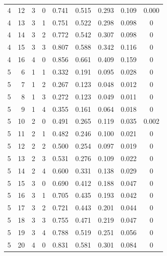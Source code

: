 \begin{table}[p]
\begin{tabular}{rrrr ccccc}
4 & 12 & 3 & 0 & 0.741 & 0.515 & 0.293 & 0.109 & 0.000 \\
4 & 13 & 3 & 1 & 0.751 & 0.522 & 0.298 & 0.098 & 0 \\
4 & 14 & 3 & 2 & 0.772 & 0.542 & 0.307 & 0.098 & 0 \\
4 & 15 & 3 & 3 & 0.807 & 0.588 & 0.342 & 0.116 & 0 \\
4 & 16 & 4 & 0 & 0.856 & 0.661 & 0.409 & 0.159 & 0 \\
\midrule
5 & 6 & 1 & 1 & 0.332 & 0.191 & 0.095 & 0.028 & 0 \\
5 & 7 & 1 & 2 & 0.267 & 0.123 & 0.048 & 0.012 & 0 \\
5 & 8 & 1 & 3 & 0.272 & 0.123 & 0.049 & 0.011 & 0 \\
5 & 9 & 1 & 4 & 0.355 & 0.161 & 0.064 & 0.018 & 0 \\
5 & 10 & 2 & 0 & 0.491 & 0.265 & 0.119 & 0.035 & 0.002 \\
5 & 11 & 2 & 1 & 0.482 & 0.246 & 0.100 & 0.021 & 0 \\
5 & 12 & 2 & 2 & 0.500 & 0.254 & 0.097 & 0.019 & 0 \\
5 & 13 & 2 & 3 & 0.531 & 0.276 & 0.109 & 0.022 & 0 \\
5 & 14 & 2 & 4 & 0.600 & 0.331 & 0.138 & 0.029 & 0 \\
5 & 15 & 3 & 0 & 0.690 & 0.412 & 0.188 & 0.047 & 0 \\
5 & 16 & 3 & 1 & 0.705 & 0.435 & 0.193 & 0.042 & 0 \\
5 & 17 & 3 & 2 & 0.721 & 0.443 & 0.201 & 0.044 & 0 \\
5 & 18 & 3 & 3 & 0.755 & 0.471 & 0.219 & 0.047 & 0 \\
5 & 19 & 3 & 4 & 0.788 & 0.519 & 0.251 & 0.056 & 0 \\
5 & 20 & 4 & 0 & 0.831 & 0.581 & 0.301 & 0.084 & 0 \\
    \bottomrule
  \end{tabular}
\end{table}
